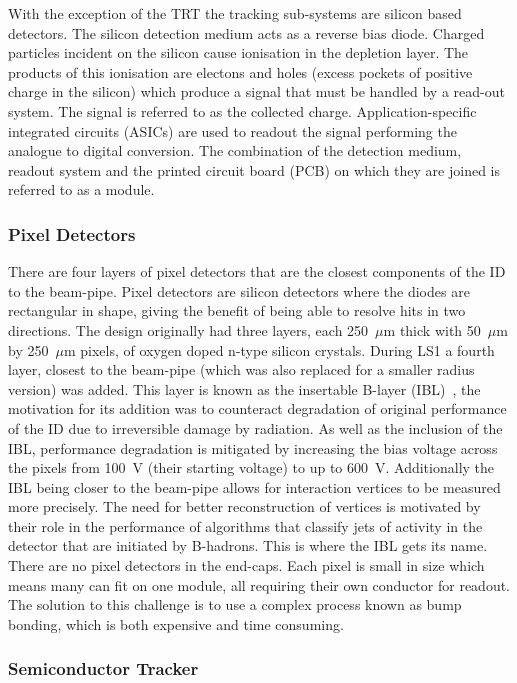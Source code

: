With the exception of the TRT the tracking sub-systems are silicon based
detectors. The silicon detection medium acts as a reverse bias diode. Charged
particles incident on the silicon cause ionisation in the depletion layer. The
products of this ionisation are electons and holes (excess pockets of positive
charge in the silicon) which produce a signal that must be handled by a
read-out system. The signal is referred to as the collected charge.
Application-specific integrated circuits (ASICs) are used to readout the signal
performing the analogue to digital conversion. The combination of the detection
medium, readout system and the printed circuit board (PCB) on which they are
joined is referred to as a module.

\subsubsection{Pixel Detectors}

There are four layers of pixel detectors that are the closest components of the
ID to the beam-pipe. Pixel detectors are silicon detectors where the diodes are
rectangular in shape, giving the benefit of being able to resolve hits
in two directions. The design originally had three layers, each 250~$\mu$m
thick with 50~$\mu$m by 250~$\mu$m pixels, of oxygen doped n-type silicon
crystals. During LS1 a fourth layer, closest to the beam-pipe (which was also
replaced for a smaller radius version) was added. This layer is known as the
insertable B-layer (IBL)~\cite{IBL-TDR}, the motivation for its addition was to
counteract degradation of original performance of the ID due to irreversible
damage by radiation. As well as the inclusion of the IBL, performance degradation
is mitigated by increasing the bias voltage across the pixels from 100~V (their
starting voltage) to up to 600~V. Additionally the IBL being closer to the
beam-pipe allows for interaction vertices to be measured more precisely. The
need for better reconstruction of vertices is motivated by their role in the
performance of algorithms that classify jets of activity in the detector that
are initiated by B-hadrons. This is where the IBL gets its name. There are no
pixel detectors in the end-caps. Each pixel is small in size which means many
can fit on one module, all requiring their own conductor for readout. The
solution to this challenge is to use a complex process known as bump bonding,
which is both expensive and time consuming.

\subsubsection{Semiconductor Tracker}

